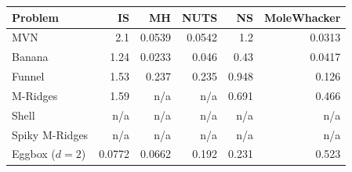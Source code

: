 \begin{tabular}{lrrrrr}
\toprule
Problem & IS & MH & NUTS & NS & MoleWhacker \\
\midrule
MVN & 2.1 & 0.0539 & 0.0542 & 1.2 & 0.0313 \\
Banana & 1.24 & 0.0233 & 0.046 & 0.43 & 0.0417 \\
Funnel & 1.53 & 0.237 & 0.235 & 0.948 & 0.126 \\
M-Ridges & 1.59 & n/a & n/a & 0.691 & 0.466 \\
Shell & n/a & n/a & n/a & n/a & n/a \\
Spiky M-Ridges & n/a & n/a & n/a & n/a & n/a \\
\midrule
Eggbox ($d=2$) & 0.0772 & 0.0662 & 0.192 & 0.231 & 0.523 \\
\bottomrule
\end{tabular}
